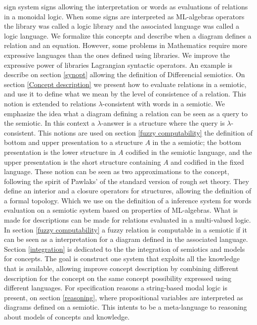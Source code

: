 \documentclass[oribibl]{llncs}
\begin{document}
sign system signs allowing the interpretation or words as evaluations of relations in a monoidal logic.  When some signs
are interpreted as ML-algebras operators the library was called a logic
library and the associated language was called a logic language. We formalize this concepts and describe when a diagram
defines a relation and an equation. However, some problems in Mathematics require more expressive languages than the ones defined using libraries. We improve the expressive power of libraries Lagrangian syntactic operators. An example is describe on section \ref{synopt}  allowing the definition of Differencial semiotics.  On section \ref{Concept description} we present how to
evaluate relations in a semiotic, and use it to define what we mean by
the level of consistence of a relation. This notion is extended to
relations $\lambda$-consistent with words in a semiotic. We emphasize the idea what a diagram defining a relation can be seen as a query to the semiotic. In this context a
$\lambda$-answer is a structure where the query is
$\lambda$-consistent. This notions are used on section \ref{fuzzy computability} the definition of
bottom and upper presentation to a structure $A$ in the a semiotic;
the bottom presentation is the lower structure in $A$ codified in
the semiotic language, and the upper presentation is the short
structure containing $A$ and codified in the fixed language. These
notion can be seen as two approximations to the concept, following the spirit of Pawlaks' of the standard version of rough set theory. They
define an interior and a closure operators for structures, allowing
the definition of a formal topology.  Which we use on the definition of a inference system for words evaluation on a semiotic system based on
properties of ML-algebras. What is made for descriptions can be made for relations evaluated in a multi-valued logic. In section \ref{fuzzy computability} a fuzzy relation is computable in a semiotic if it can be seen as a interpretation for a diagram defined in the associated language.  Section \ref{integration} is dedicated to the the integration of semiotics and models for concepts. The goal is construct one system that exploits all the knowledge that is available, allowing improve concept description by combining different description for the concept on the same concept possibility expressed using different languages. For specification reasons a string-based modal logic is present, on section \ref{reasoning}, where propositional variables are  interpreted as diagrams defined on a semiotic. This intents to be a meta-language to reasoning about models of concepts and knowledge.
\end{document}
